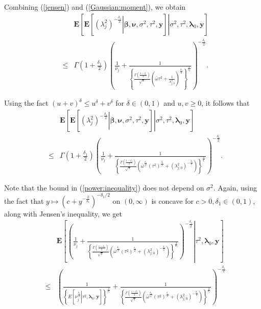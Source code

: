 \documentclass[noinfoline,11pt]{imsart}
\numberwithin{equation}{section}
\theoremstyle{plain}
\newcommand{\y}{\mathbf{y}}
\newcommand{\bl}{\boldsymbol{\lambda}}
\newcommand{\E}{\boldsymbol{E}}
\begin{document}
\noindent
Combining (\ref{jensen}) and (\ref{Gaussian:moment}), we obtain 
\begin{eqnarray*}
&&    \E\left[\left.\E\left[\left.\left(\lambda_j^2\right)^{-\frac{\delta_1}{2}}\right|\boldsymbol{\beta,\nu},\sigma^2,\tau^2,\mathbf{\y}\right]\right|\sigma^2,\tau^2,\mathbf{\bl}_0,\mathbf{\y}\right]\\
     &\leq& \Gamma\left(1+\frac{\delta_1}{2}\right)\left(\frac{1}{\nu_j}+\frac{1}{\left\{\frac{\Gamma\left(\frac{1-\delta_1}{2}\right)}{\sqrt{\pi}}\left(\bar{\omega}\tau^2+\frac{1}{\lambda_{j;0}^2}\right)^{\frac{\delta_1}{2}}\right\}^{\frac{2}{\delta_1}}}\right)^{-\frac{\delta_1}{2}}. 
\end{eqnarray*}
     
Using the fact $\left(u+v\right)^{\delta}\leq u^{\delta}+v^{\delta}$ for $\delta\in(0,1)$ and $u,v\geq 0$, it follows that 
\begin{eqnarray}
&&    \E\left[\left.\E\left[\left.\left(\lambda_j^2\right)^{-\frac{\delta_1}{2}}\right|\boldsymbol{\beta,\nu},\sigma^2,\tau^2,\mathbf{\y}\right]\right|\sigma^2,\tau^2,\mathbf{\bl}_0,\mathbf{\y}\right] \nonumber\\
     &\leq& \Gamma\left(1+\frac{\delta_1}{2}\right)\left(\frac{1}{\nu_j}+\frac{1}{\left\{\frac{\Gamma\left(\frac{1-\delta_1}{2}\right)}{\sqrt{\pi}}\left(\bar{\omega}^{\frac{\delta_1}{2}}\left(\tau^2\right)^{\frac{\delta_1}{2}}+\left(\lambda_{j;0}^2\right)^{-\frac{\delta_1}{2}}\right)\right\}^{\frac{2}{\delta_1}}}\right)^{-\frac{\delta_1}{2}}. \label{power:inequality}
\end{eqnarray}

\noindent
Note that the bound in (\ref{power:inequality}) does not depend on $\sigma^2$. Again, using the fact that  $y\mapsto\left(c+y^{-\frac{2}{\delta_1}}\right)^{-\delta_1/2}$ on $(0,\infty)$ is concave for $c > 0, \delta_1 \in (0,1)$, along with  Jensen's inequality, we get 
\begin{eqnarray*}
& & \E\left[\left.\left(\frac{1}{\nu_j}+\frac{1}{\left\{\frac{\Gamma\left(\frac{1-\delta_1}{2}\right)}{\sqrt{\pi}}\left(\bar{\omega}^{\frac{\delta_1}{2}}\left(\tau^2\right)^{\frac{\delta_1}{2}}+\left(\lambda_{j;0}^2\right)^{-\frac{\delta_1}{2}}\right)\right\}^{\frac{2}{\delta_1}}}\right)^{-\frac{\delta_1}{2}}\right|\tau^2,\mathbf{\bl}_0,\mathbf{y}\right]\\
   &\leq& \left(\frac{1}{\left\{E\left[\left.\nu_j^{\frac{\delta_1}{2}}\right|\tau^2,\mathbf{\lambda}_0,\mathbf{y}\right]\right\}^{\frac{2}{\delta_1}}}+\frac{1}{\left\{\frac{\Gamma\left(\frac{1-\delta_1}{2}\right)}{\sqrt{\pi}}\left(\bar{\omega}^{\frac{\delta_1}{2}}\left(\tau^2\right)^{\frac{\delta_1}{2}}+\left(\lambda_{j;0}^2\right)^{-\frac{\delta_1}{2}}\right)\right\}^{\frac{2}{\delta_1}}}\right)^{-\frac{\delta_1}{2}} 
   \end{eqnarray*}
\end{document}
